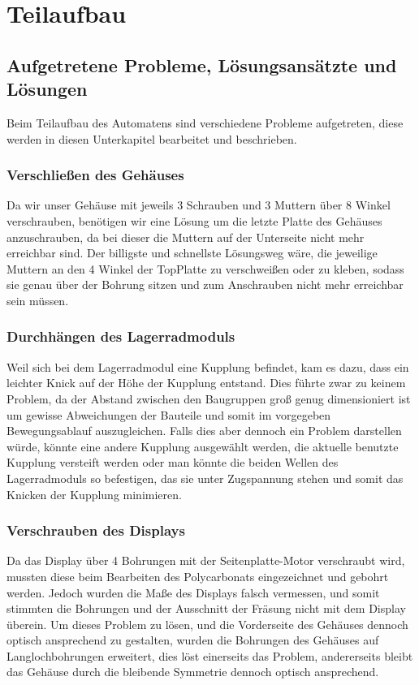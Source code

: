 \section{Teilaufbau}

\subsection{Aufgetretene Probleme, Lösungsansätzte und Lösungen}
Beim Teilaufbau des Automatens sind verschiedene Probleme aufgetreten, diese werden in diesen Unterkapitel bearbeitet und beschrieben.

\subsubsection{Verschließen des Gehäuses}
Da wir unser Gehäuse mit jeweils 3 Schrauben und 3 Muttern über 8 Winkel verschrauben, benötigen
wir eine Lösung um die letzte Platte des Gehäuses anzuschrauben, da bei dieser die Muttern
auf der Unterseite nicht mehr erreichbar sind. Der billigste und schnellste Lösungsweg wäre,
die jeweilige Muttern an den 4 Winkel der TopPlatte zu verschweißen oder zu kleben, sodass sie genau über der
Bohrung sitzen und zum Anschrauben nicht mehr erreichbar sein müssen.

\subsubsection{Durchhängen des Lagerradmoduls}
Weil sich bei dem Lagerradmodul eine Kupplung befindet, kam es dazu, dass ein leichter Knick
auf der Höhe der Kupplung entstand. Dies führte zwar zu keinem Problem, da der Abstand zwischen
den Baugruppen groß genug dimensioniert ist um gewisse Abweichungen der Bauteile und somit im
vorgegeben Bewegungsablauf auszugleichen. Falls dies aber dennoch ein Problem darstellen würde,
könnte eine andere Kupplung ausgewählt werden, die aktuelle benutzte Kupplung versteift werden oder
man könnte die beiden Wellen des Lagerradmoduls so befestigen, das sie unter
Zugspannung stehen und somit das Knicken der Kupplung minimieren.

\subsubsection{Verschrauben des Displays}
Da das Display über 4 Bohrungen mit der Seitenplatte-Motor verschraubt wird, mussten diese
beim Bearbeiten des Polycarbonats eingezeichnet und gebohrt werden. Jedoch wurden
die Maße des Displays falsch vermessen, und somit stimmten die Bohrungen und der Ausschnitt
der Fräsung nicht mit dem Display überein. Um dieses Problem zu lösen, und die
Vorderseite des Gehäuses dennoch optisch ansprechend zu gestalten, wurden die Bohrungen
des Gehäuses auf Langlochbohrungen erweitert, dies löst einerseits das Problem, andererseits
bleibt das Gehäuse durch die bleibende Symmetrie dennoch optisch ansprechend.


